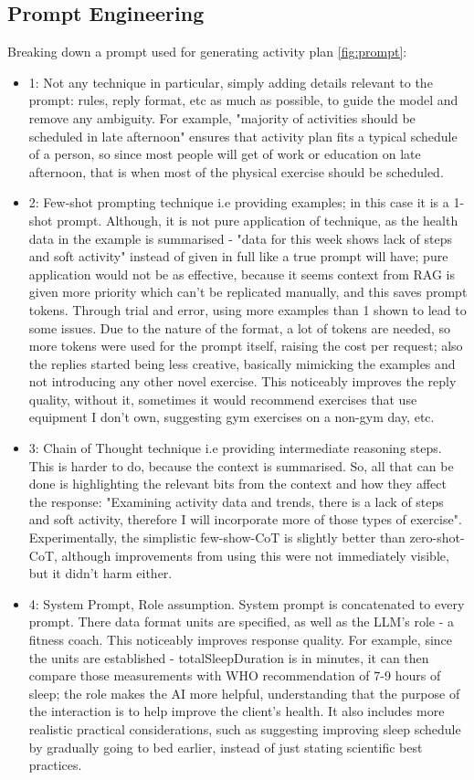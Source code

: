 \subsection{Prompt Engineering}
Breaking down a prompt used for generating activity plan \ref{fig:prompt}:
\begin{itemize}
    \item 1: Not any technique in particular, simply adding details relevant to the prompt: rules, reply format, etc as much as possible, to guide the model and remove any ambiguity. For example, "majority of activities should be scheduled in late afternoon" ensures that activity plan fits a typical schedule of a person, so since most people will get of work or education on late afternoon, that is when most of the physical exercise should be scheduled.
    \item 2: Few-shot prompting technique i.e providing examples; in this case it is a 1-shot prompt. Although, it is not pure application of technique, as the health data in the example is summarised - "data for this week shows lack of steps and soft activity" instead of given in full like a true prompt will have; pure application would not be as effective, because it seems context from RAG is given more priority which can't be replicated manually, and this saves prompt tokens. Through trial and error, using more examples than 1 shown to lead to some issues. Due to the nature of the format, a lot of tokens are needed, so more tokens were used for the prompt itself, raising the cost per request; also the replies started being less creative, basically mimicking the examples and not introducing any other novel exercise. This noticeably improves the reply quality, without it, sometimes it would recommend exercises that use equipment I don't own, suggesting gym exercises on a non-gym day, etc.
    \item 3: Chain of Thought technique i.e providing intermediate reasoning steps. This is harder to do, because the context is summarised. So, all that can be done is highlighting the relevant bits from the context and how they affect the response: "Examining activity data and trends, there is a lack of steps and soft activity, therefore I will incorporate more of those types of exercise". Experimentally, the simplistic few-show-CoT is slightly better than zero-shot-CoT, although improvements from using this were not immediately visible, but it didn't harm either.
    \item 4: System Prompt, Role assumption. System prompt is concatenated to every prompt. There data format units are specified, as well as the LLM's role - a fitness coach. This noticeably improves response quality. For example, since the units are established - totalSleepDuration is in minutes, it can then compare those measurements with WHO recommendation of 7-9 hours of sleep; the role makes the AI more helpful, understanding that the purpose of the interaction is to help improve the client's health. It also includes more realistic practical considerations, such as suggesting improving sleep schedule by gradually going to bed earlier, instead of just stating scientific best practices.
\end{itemize}